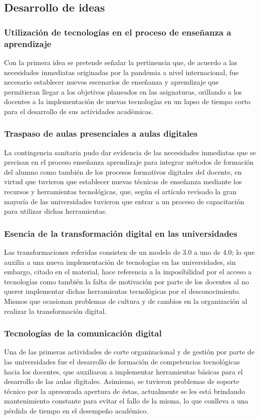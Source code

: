 \documentclass{article}
\begin{document}
\subsection{Desarrollo de ideas}
\subsubsection{Utilización de tecnologías en el proceso de enseñanza a aprendizaje}
Con la primera idea se pretende señalar la pertinencia que, de acuerdo a las necesidades inmediatas originadas por la pandemia a nivel internacional, fue necesario establecer nuevos escenarios de enseñanza y aprendizaje que permitieran llegar a los objetivos planeados en las asignaturas, orillando a los docentes a la implementación de nuevas tecnologías en un lapso de tiempo corto para el desarrollo de sus actividades académicas. 

\subsubsection{Traspaso de aulas presenciales a aulas digitales}
La contingencia sanitaria pudo dar evidencia de las necesidades inmediatas que se precisan en el proceso enseñanza aprendizaje para integrar métodos de formación del alumno como también de los procesos formativos  digitales del docente, en virtud que tuvieron que establecer nuevas técnicas de enseñanza mediante los recursos y herramientas tecnológicas, que, según el artículo revisado la gran mayoría de las universidades tuvieron que entrar a un proceso de capacitación para utilizar dichas herramientas.

\subsubsection{Esencia de la transformación digital en las universidades}
Las transformaciones referidas consisten de un modelo de 3.0 a uno de 4.0; lo que auxilia a una nueva implementación de tecnologías en las universidades, sin embargo, citado en el material, hace referencia a la imposibilidad por el acceso a tecnologías como también la falta de motivación por parte de los docentes al no querer implementar dichas herramientas tecnológicas por el desconocimiento. Mismos que ocasionan problemas de cultura y de cambios en la organización al realizar la transformación digital.

\subsubsection{Tecnologías de la comunicación digital}
Una de las primeras actividades de corte organizacional y de gestión por parte de las universidades fue el desarrollo de formación de competencias tecnológicas hacia los docentes, que auxiliaron a implementar herramientas básicas para el desarrollo de las aulas digitales. Asimismo, se tuvieron problemas de soporte técnico por la apresurada apertura de éstas, actualmente se les está brindando mantenimiento constante para evitar el fallo de la misma, lo que conlleva a una pérdida de tiempo en el desempeño académico.
\end{document}
